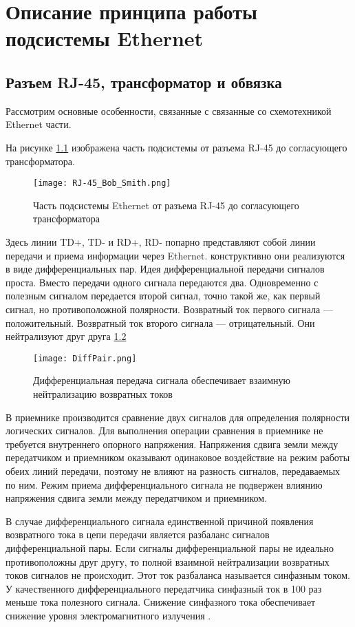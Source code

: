 \chapter{Описание принципа работы подсистемы Ethernet}
\section{Разъем RJ-45, трансформатор и обвязка}
\hspace{1cm} 

Рассмотрим основные особенности, связанные с связанные со схемотехникой Ethernet части. 

На рисунке \ref{ris:RJ-45} изображена часть подсистемы от разъема RJ-45 до согласующего трансформатора. 

\begin{figure}[H]
\centering
\texttt{[image: RJ-45\_Bob\_Smith.png]}
\caption{Часть подсистемы Ethernet от разъема RJ-45 до согласующего трансформатора}
\label{ris:RJ-45}
\end{figure}

Здесь линии TD+, TD- и RD+, RD- попарно представляют собой линии передачи и приема информации через Ethernet. 
конструктивно они реализуются в виде дифференциальных пар. 
Идея дифференциальной передачи сигналов проста. Вместо передачи одного
сигнала передаются два. Одновременно с полезным сигналом передается второй
сигнал, точно такой же, как первый сигнал, но противоположной полярности.
Возвратный ток первого сигнала — положительный. Возвратный ток второго сигнала — 
отрицательный. Они нейтрализуют друг друга \ref{ris:DiffPair}

\begin{figure}[H]
\centering
\texttt{[image: DiffPair.png]}
\caption{Дифференциальная передача сигнала обеспечивает взаимную нейтрализацию
возвратных токов}
\label{ris:DiffPair}
\end{figure}

В приемнике производится сравнение двух сигналов для определения полярности логических сигналов. Для 
выполнения операции сравнения в приемнике не требуется внутреннего опорного напряжения. Напряжения сдвига земли
между передатчиком и приемником оказывают одинаковое воздействие на режим работы
обеих линий передачи, поэтому не влияют на разность сигналов, передаваемых по ним. 
Режим приема дифференциального сигнала не подвержен влиянию напряжения сдвига земли между передатчиком и 
приемником.

В случае дифференциального сигнала единственной причиной появления возвратного тока в цепи передачи является 
разбаланс сигналов дифференциальной пары. Если сигналы дифференциальной пары не идеально противоположны друг
другу, то полной взаимной нейтрализации возвратных токов сигналов не происходит. Этот ток разбаланса называется 
синфазным током. У качественного дифференциального передатчика синфазный ток в 100 раз меньше тока полезного
сигнала. Снижение синфазного тока обеспечивает снижение уровня электромагнитного излучения 
\cite{Howard J: Start Black Magic}.

